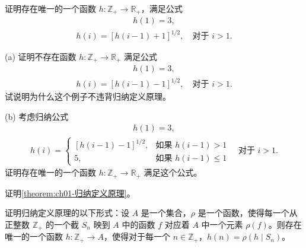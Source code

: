 \documentclass[../../main.tex]{subfiles}
\begin{document}
\begin{exercise}\label{exercise:ch01-归纳定义-5}
证明存在唯一的一个函数 $h: \mathbb{Z}_{+} \longrightarrow \mathbb{R}_{+}$，满足公式
\begin{align*}
h(1) = 3,
\end{align*}
\begin{align*}
h(i) = [h(i-1) + 1]^{1/2}, \quad \text{对于 } i > 1.
\end{align*}
\end{exercise}

\begin{exercise}\label{exercise:ch01-归纳定义-6}
(a) 证明不存在函数 $h: \mathbb{Z}_{+} \longrightarrow \mathbb{R}_{+}$ 满足公式
\begin{align*}
h(1) = 3,
\end{align*}
\begin{align*}
h(i) = [h(i-1) - 1]^{1/2}, \quad \text{对于 } i > 1.
\end{align*}
试说明为什么这个例子不违背归纳定义原理。

(b) 考虑归纳公式
\begin{align*}
h(1) = 3,
\end{align*}
\begin{align*}
h(i) =
\begin{cases}
[h(i-1) - 1]^{1/2}, & \text{如果 } h(i-1) > 1\\
5, & \text{如果 } h(i-1) \leqslant 1
\end{cases}
\quad \text{对于 } i > 1.
\end{align*}
证明存在唯一的一个函数 $h: \mathbb{Z}_{+} \longrightarrow \mathbb{R}_{+}$ 满足这个公式。
\end{exercise}

\begin{exercise}\label{exercise:ch01-归纳定义-7}
证明\cref{theorem:ch01-归纳定义原理}。
\end{exercise}

\begin{exercise}\label{exercise:ch01-归纳定义-8}
证明归纳定义原理的以下形式：设 $A$ 是一个集合，$\rho$ 是一个函数，使得每一个从正整数 $\mathbb{Z}_{+}$ 的一个截 $S_{n}$ 映到 $A$ 中的函数 $f$ 对应着 $A$ 中一个元素 $\rho(f)$。则存在唯一的一个函数 $h: \mathbb{Z}_{+} \longrightarrow A$，使得对于每一个 $n \in \mathbb{Z}_{+}$，$h(n) = \rho(h \mid S_{n})$。
\end{exercise}
\end{document}
